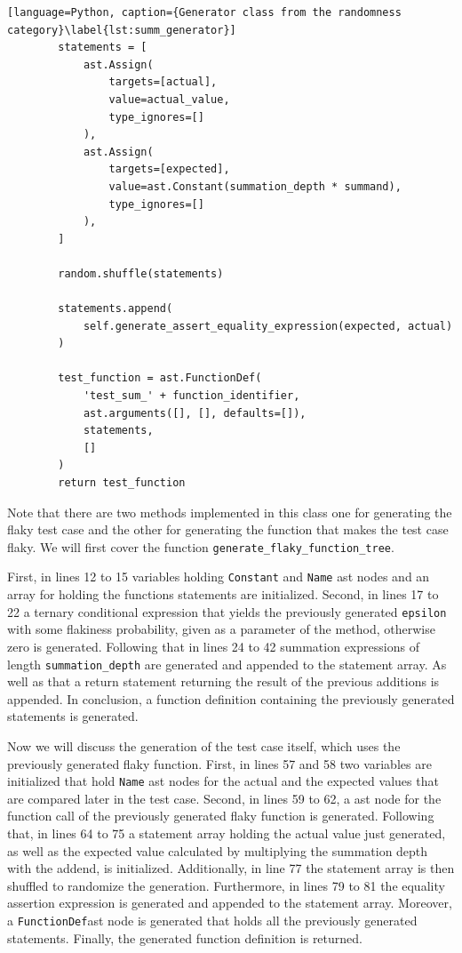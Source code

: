 \documentclass[
fancyheadings, %
%
%
]{stsreprt}
\begin{document}
\begin{lstlisting}[language=Python, caption={Generator class from the randomness category}\label{lst:summ_generator}]
        statements = [
            ast.Assign(
                targets=[actual], 
                value=actual_value,
                type_ignores=[]
            ),
            ast.Assign(
                targets=[expected], 
                value=ast.Constant(summation_depth * summand),
                type_ignores=[]
            ),
        ]

        random.shuffle(statements)

        statements.append(
            self.generate_assert_equality_expression(expected, actual)
        )

        test_function = ast.FunctionDef(
            'test_sum_' + function_identifier,
            ast.arguments([], [], defaults=[]),
            statements,
            []
        )
        return test_function

\end{lstlisting}
Note that there are two methods implemented in this class one for generating the flaky test case and the other for generating the function that makes the test case flaky. 
We will first cover the function \lstinline{generate_flaky_function_tree}. \par
First, in lines 12 to 15 variables holding \texttt{Constant} and \texttt{Name} \acrshort{ast} nodes and an array for holding the functions statements are initialized. 
Second, in lines 17 to 22 a ternary conditional expression that yields the previously generated \texttt{epsilon} with some flakiness probability, given as a parameter of the method, otherwise zero is generated. 
Following that in lines 24 to 42  summation expressions of length \lstinline{summation_depth} are generated and appended to the statement array. 
As well as that a return statement returning the result of the previous additions is appended. 
In conclusion, a function definition containing the previously generated statements is generated. \par
Now we will discuss the generation of the test case itself, which uses the previously generated flaky function.
First, in lines 57 and 58 two variables are initialized that hold \texttt{Name} \acrshort{ast} nodes for the actual and the expected values that are compared later in the test case. 
Second, in lines 59 to 62, a \acrshort{ast} node for the function call of the previously generated flaky function is generated. 
Following that, in lines 64 to 75 a statement array holding the actual value just generated, as well as the expected value calculated by multiplying the summation depth with the addend, is initialized. 
Additionally, in line 77 the statement array is then shuffled to randomize the generation. 
Furthermore, in lines 79 to 81 the equality assertion expression is generated and appended to the statement array. 
Moreover, a \texttt{FunctionDef}\acrshort{ast} node is generated that holds all the previously generated statements.
Finally, the generated function definition is returned. 
\end{document}
